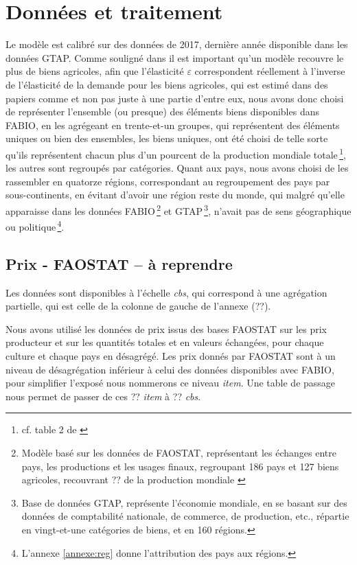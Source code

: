\section{Données et traitement}

Le modèle est calibré sur des données de 2017, dernière année disponible dans les données GTAP. Comme souligné dans \cite{Gouel2021} il est important qu'un modèle recouvre le plus de biens agricoles, afin que l'élasticité $\varepsilon$ correspondent réellement à l'inverse de l'élasticité de la demande pour les biens agricoles, qui est estimé dans des papiers comme \cite{Comin2021} et non pas juste à une partie d'entre eux, nous avons donc choisi de représenter l'ensemble (ou presque) des éléments biens disponibles dans FABIO, en les agrégeant en trente-et-un groupes, qui représentent des éléments uniques ou bien des ensembles, les biens uniques, ont été choisi de telle sorte qu'ils représentent chacun plus d'un pourcent de la production mondiale totale\,\footnote{cf. table 2 de \cite{Gouel2021}}, les autres sont regroupés par catégories. Quant aux pays, nous avons choisi de les rassembler en quatorze régions, correspondant au regroupement des pays par sous-continents, en évitant d'avoir une région reste du monde, qui malgré qu'elle apparaisse dans les données FABIO\,\footnote{Modèle basé sur les données de FAOSTAT, représentant les échanges entre pays, les productions et les usages finaux, regroupant 186 pays et 127 biens agricoles, recouvrant ?? de la production mondiale \cite{Bruckner2019}} et GTAP\,\footnote{Base de données GTAP, représente l'économie mondiale, en se basant sur des données de comptabilité nationale, de commerce, de production, etc., répartie en vingt-et-une catégories de biens, et en 160 régions.}, n'avait pas de sens géographique ou politique\,\footnote{L'annexe \ref{annexe:reg} donne l'attribution des pays aux régions.}.


\subsection{Prix - FAOSTAT -- \textbf{à reprendre}}\label{subsec:prix}

Les données sont disponibles à l'échelle \textit{cbs}, qui correspond à une agrégation partielle, qui est celle de la colonne de gauche de l'annexe (??).

Nous avons utilisé les données de prix issus des bases FAOSTAT sur les prix producteur et sur les quantités totales et en valeurs échangées, pour chaque culture et chaque pays en désagrégé. Les prix donnés par FAOSTAT sont à un niveau de désagrégation inférieur à celui des données disponibles avec FABIO, pour simplifier l'exposé nous nommerons ce niveau \textit{item}. Une table de passage nous permet de passer de ces ?? \textit{item} à ?? \textit{cbs}.

